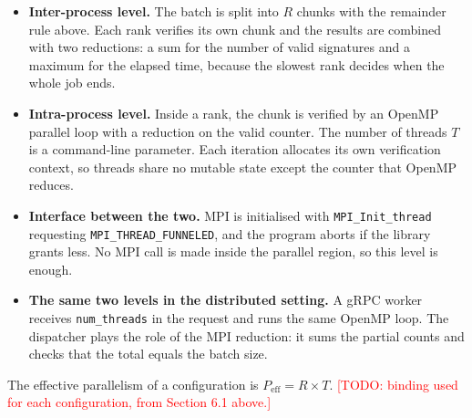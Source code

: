 \documentclass[11pt,a4paper]{article}
\newcommand{\todo}[1]{\textcolor{red}{[TODO: #1]}}
\begin{document}
\begin{itemize}[nosep]
  \item \textbf{Inter-process level.} The batch is split into $R$ chunks with the remainder rule above. Each rank verifies its own chunk and the results are combined with two reductions: a sum for the number of valid signatures and a maximum for the elapsed time, because the slowest rank decides when the whole job ends.
  \item \textbf{Intra-process level.} Inside a rank, the chunk is verified by an OpenMP parallel loop with a reduction on the valid counter. The number of threads $T$ is a command-line parameter. Each iteration allocates its own verification context, so threads share no mutable state except the counter that OpenMP reduces.
  \item \textbf{Interface between the two.} MPI is initialised with \texttt{MPI\_Init\_thread} requesting \texttt{MPI\_THREAD\_FUNNELED}, and the program aborts if the library grants less. No MPI call is made inside the parallel region, so this level is enough.
  \item \textbf{The same two levels in the distributed setting.} A gRPC worker receives \texttt{num\_threads} in the request and runs the same OpenMP loop. The dispatcher plays the role of the MPI reduction: it sums the partial counts and checks that the total equals the batch size.
\end{itemize}

The effective parallelism of a configuration is $P_{\mathrm{eff}} = R\times T$. \todo{binding used for each configuration, from Section 6.1 above.}
\end{document}
